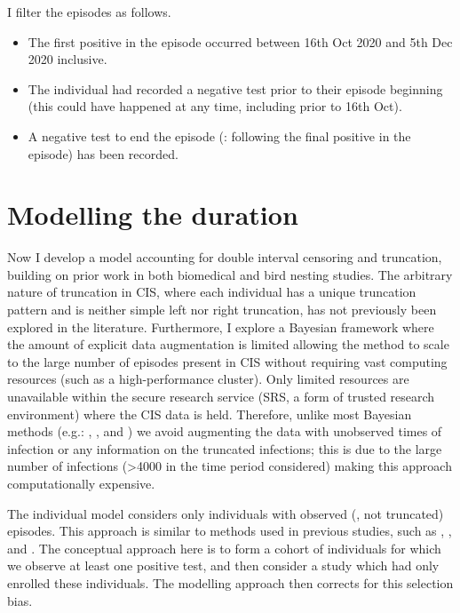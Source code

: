 \documentclass[thesis.tex]{subfiles}
\begin{document}
I filter the episodes as follows.
\begin{itemize}
\item
  The first positive in the episode occurred between 16th Oct 2020 and
  5th Dec 2020 inclusive.
\item
  The individual had recorded a negative test prior to their episode
  beginning (this could have happened at any time, including prior to
  16th Oct).
\item
  A negative test to end the episode (\ie: following the final positive in the episode) has been recorded.
\end{itemize}


\section{Modelling the duration}\label{perf-test:sec:model}
Now I develop a model accounting for double interval censoring and truncation, building on prior work in both biomedical and bird nesting studies.
The arbitrary nature of truncation in CIS, where each individual has a unique truncation pattern and is neither simple left nor right truncation, has not previously been explored in the literature.
Furthermore, I explore a Bayesian framework where the amount of explicit data augmentation is limited allowing the method to scale to the large number of episodes present in CIS without requiring vast computing resources (such as a high-performance cluster).
Only limited resources are unavailable within the secure research service (SRS, a form of trusted research environment) where the CIS data is held.
Therefore, unlike most Bayesian methods (e.g.: \textcite{heBayesiana}, \textcite{heBayesian}, and \textcite{caoModeling}) we avoid augmenting the data with unobserved times of infection or any information on the truncated infections; this is due to the large number of infections (>4000 in the time period considered) making this approach computationally expensive.

The individual model considers only individuals with observed (\ie, not truncated) episodes.
This approach is similar to methods used in previous studies, such as \textcite{heiseyModelling}, \textcite{dempsterMaximum}, and \textcite{turnbullEmpirical}.
The conceptual approach here is to form a cohort of individuals for which we observe at least one positive test, and then consider a study which had only enrolled these individuals.
The modelling approach then corrects for this selection bias.
\end{document}
